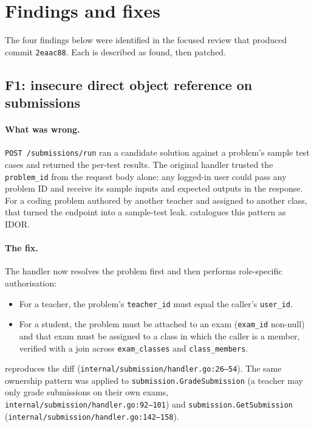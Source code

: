\section{Findings and fixes}

The four findings below were identified in the focused review that produced commit \texttt{2eaac88}. Each is described as found, then patched.

\subsection{F1: insecure direct object reference on submissions}

\paragraph{What was wrong.} \texttt{POST /submissions/run} ran a candidate solution against a problem's sample test cases and returned the per-test results. The original handler trusted the \texttt{problem\_id} from the request body alone: any logged-in user could pass any problem ID and receive its sample inputs and expected outputs in the response. For a coding problem authored by another teacher and assigned to another class, that turned the endpoint into a sample-test leak. \cite{cwe-639} catalogues this pattern as IDOR.

\paragraph{The fix.} The handler now resolves the problem first and then performs role-specific authorisation:

\begin{itemize}
  \item For a teacher, the problem's \texttt{teacher\_id} must equal the caller's \texttt{user\_id}.
  \item For a student, the problem must be attached to an exam (\texttt{exam\_id} non-null) and that exam must be assigned to a class in which the caller is a member, verified with a join across \texttt{exam\_classes} and \texttt{class\_members}.
\end{itemize}

 reproduces the diff (\texttt{internal/submission/handler.go:26--54}). The same ownership pattern was applied to \texttt{submission.GradeSubmission} (a teacher may only grade submissions on their own exams, \texttt{internal/submission/handler.go:92--101}) and \texttt{submission.GetSubmission} (\texttt{internal/submission/handler.go:142--158}).

